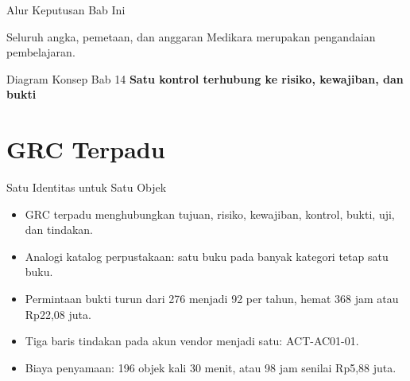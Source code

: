 \documentclass[aspectratio=169, table, 12pt]{beamer}
\begin{document}
\begin{frame}{{\Large Alur Keputusan Bab Ini}}
  \vspace{20pt}
  \begin{center}
    \resizebox{0.95\textwidth}{!}{}
  \end{center}
  \vspace{10pt}
  \small Seluruh angka, pemetaan, dan anggaran Medikara merupakan pengandaian pembelajaran.
\end{frame}

\begin{frame}{{\Large Diagram Konsep Bab 14}}
  \centering
  {\small\bfseries Satu kontrol terhubung ke risiko, kewajiban, dan bukti}\par\medskip
  \label{fig:session14-ilustrasi-bab}
\end{frame}

\section{GRC Terpadu}

\begin{frame}{{\Large Satu Identitas untuk Satu Objek}}
  \vspace{6pt}
  \small
  \begin{itemize}
    \item GRC terpadu menghubungkan tujuan, risiko, kewajiban, kontrol, bukti, uji, dan tindakan.
    \item Analogi katalog perpustakaan: satu buku pada banyak kategori tetap satu buku.
    \item Permintaan bukti turun dari 276 menjadi 92 per tahun, hemat 368 jam atau Rp22,08 juta.
    \item Tiga baris tindakan pada akun vendor menjadi satu: ACT-AC01-01.
    \item Biaya penyamaan: 196 objek kali 30 menit, atau 98 jam senilai Rp5,88 juta.
  \end{itemize}
\end{frame}
\end{document}
